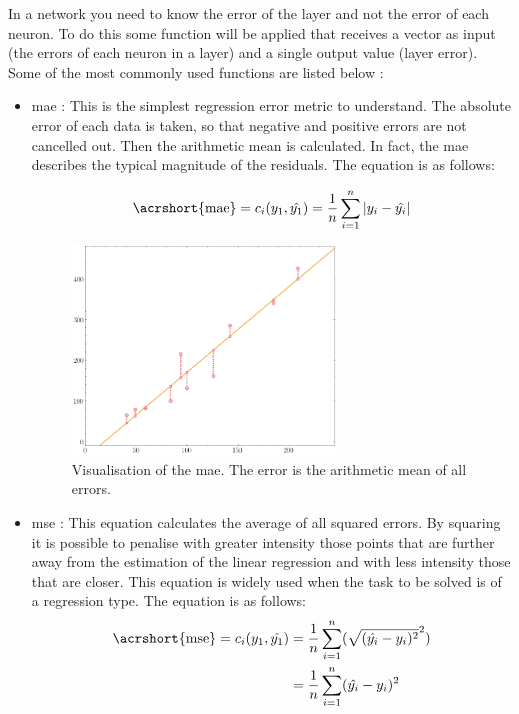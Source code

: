In a network you need to know the error of the layer and not the error of each neuron. To do this some function will be applied that receives a vector as input (the errors of each neuron in a layer) and a single output value (layer error). Some of the most commonly used functions are listed below \cite{tensorflow2015-whitepaper}:


\begin{itemize}
\item \acrfull{mae} \cite{errors_basics} \label{MAE_loss}: This is the simplest regression error metric to understand. The absolute error of each data is taken, so that negative and positive errors are not cancelled out. Then the arithmetic mean is calculated. In fact, the \acrshort{mae} describes the typical magnitude of the residuals. The equation is as follows:

\begin{equation}
\centering
    \begin{split}
        \text{\acrshort{mae}} = c_i(y_1, \hat{y_1}) = \frac{1}{n} \sum_{i=1}^n |y_i - \hat{y_i}|
    \end{split}
\end{equation}

\begin{figure}[H]
    \centering
    \includegraphics[width=7cm]{images/state-of-art/cost-function/mae.png}
    \caption{Visualisation of the \acrshort{mae}. The error is the arithmetic mean of all errors.}
    \label{fig:error_mae}
\end{figure}

\item \acrfull{mse} \cite{errors_basics}\label{MSE_loss}: This equation calculates the average of all squared errors. By squaring it is possible to penalise with greater intensity those points that are further away from the estimation of the linear regression and with less intensity those that are closer. This equation is widely used when the task to be solved is of a regression type. The equation is as follows:
\begin{equation}
\centering
    \begin{split}
        \text{\acrshort{mse}} = c_i(y_1, \hat{y_1}) &= \frac{1}{n} \sum_{i=1}^n (\sqrt{(\hat{y_i} - y_i)^2}^2) \\
        & = \frac{1}{n} \sum_{i=1}^n (\hat{y_i} - y_i)^2
    \end{split}
\end{equation}


\end{itemize}
